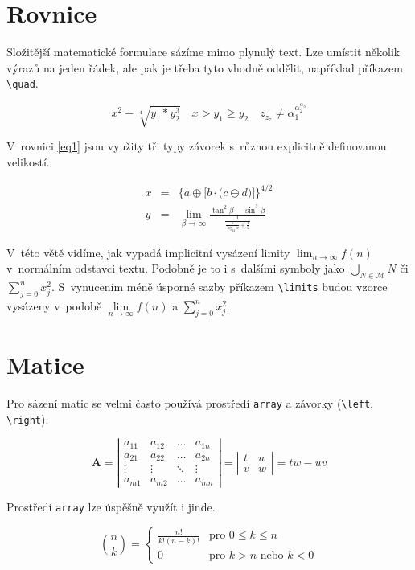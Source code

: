 \documentclass[a4paper, twocolumn, 11pt]{article}
\begin{document}
\section{Rovnice}
Složitější matematické formulace sázíme mimo plynulý text. Lze umístit několik výrazů na jeden řádek, ale pak je třeba tyto vhodně oddělit, například příkazem \verb|\quad|.

$$
x^{2}-\sqrt[4]{y_{1} * y_{2}^{3}} \quad x>y_{1} \geq y_{2} \quad z_{z_{z}} \neq \alpha_{1}^{\alpha_{2}^{\alpha_{3}}}
$$

V~rovnici \eqref{eq1} jsou využity tři typy závorek s~různou explicitně definovanou velikostí.

\begin{eqnarray}
x &=& \bigg\{a \oplus\Big[b \cdot\big(c \ominus d\big)\Big]\bigg\}^{4 / 2}\label{eq1} \\
y &=& \lim _{\beta \rightarrow \infty} \frac{\tan ^{2} \beta-\sin ^{3} \beta}{\frac{1}{\frac{1}{\log _{42} x}+\frac{1}{2}}}\label{eq2}
\end{eqnarray}


V~této větě vidíme, jak vypadá implicitní vysázení limity $\lim _{n \rightarrow \infty} f(n)$ v~normálním odstavci textu. Podobně je to i s~dalšími symboly jako $\bigcup_{N \in \mathcal{M}} N$ či $\sum_{j=0}^{n} x_{j}^{2}$. 
S~vynucením méně úsporné sazby příkazem \verb|\limits| budou vzorce vysázeny v~podobě $\lim\limits_{n \rightarrow \infty} f(n)$ a $\sum\limits^n_{j=0} x^2_j$.

\section{Matice}
Pro sázení matic se velmi často používá prostředí \texttt{array} a závorky (\verb|\left|, \verb|\right|).

$$
\mathbf{A}=\left|\begin{array}{cccc}
a_{11} & a_{12} & \ldots & a_{1 n} \\
a_{21} & a_{22} & \ldots & a_{2 n} \\
\vdots & \vdots & \ddots & \vdots \\
a_{m 1} & a_{m 2} & \ldots & a_{m n}
\end{array}\right|=\left|\begin{array}{cc}
t & u \\
v & w
\end{array}\right|=t w-u v
$$

Prostředí \texttt{array} lze úspěšně využít i jinde.

$$
\binom{n}{k}=\left\{\begin{array}{cl}
\frac{n !}{k !(n-k) !} & \text {pro } 0 \leq k \leq n \\
0 & \text {pro } k>n \text { nebo } k<0
\end{array}\right.
$$
\end{document}

